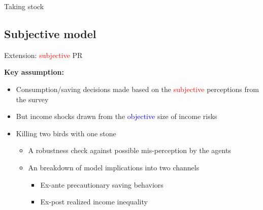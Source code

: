 \documentclass{beamer}
\begin{document}
\begin{frame}{Taking stock}
	\label{StE_dist_compare_table}
	\begin{table}[p]
		\centering
		\begin{adjustbox}{width={0.8\textwidth}}
		
	\end{adjustbox}
	\end{table}
\end{frame}

\subsection{Subjective model}


\begin{frame}{Extension: \textcolor{red}{subjective} PR}
	
	\textbf{Key assumption:}
	\\
	\begin{itemize}
		\item Consumption/saving decisions made based on the \textcolor{red}{subjective} perceptions from the survey
		\item But income shocks drawn from the \textcolor{blue}{objective} size of income risks
	\end{itemize}
	
	\begin{itemize}
		\item Killing two birds with one stone 
		\begin{itemize}
			\item A robustness check against possible mis-perception by the agents
			\item An breakdown of model implications into two channels 
			\begin{itemize}
				\item Ex-ante precautionary saving behaviors 
				\item Ex-post realized income inequality 
			\end{itemize}
		\end{itemize}
	\end{itemize}
\end{frame}
\end{document}
